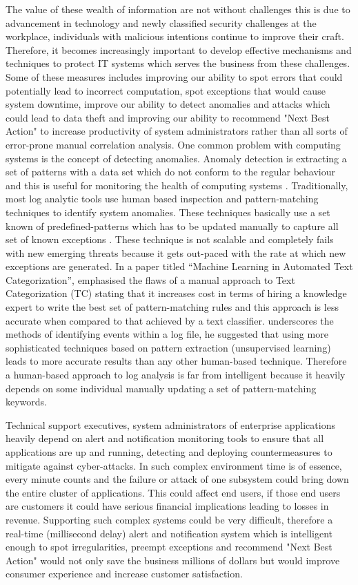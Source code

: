 \documentclass[12pt, letterpaper, titlepage]{report}
\begin{document}
The value of these wealth of information are not without challenges this is due to advancement in technology and newly classified security challenges at the workplace, individuals with malicious intentions continue to improve their craft. Therefore, it becomes increasingly important to develop effective mechanisms and techniques to protect IT systems which serves the business from these challenges. Some of these measures includes improving our ability to spot errors that could potentially lead to incorrect computation, spot exceptions that would cause system downtime, improve our ability to detect anomalies and attacks which could lead to data theft and improving our ability to recommend "Next Best Action" to increase productivity of system administrators rather than all sorts of error-prone manual correlation analysis. One common problem with computing systems is the concept of detecting anomalies. Anomaly detection is extracting a set of patterns with a data set which do not conform to the regular behaviour and this is useful for monitoring the health of computing systems \citep{chandola2009anomaly}.  Traditionally, most log analytic tools use human based inspection and pattern-matching techniques to identify system anomalies. These techniques basically use a set known of predefined-patterns which has to be updated manually to capture all set of known exceptions \citep{ma2003log}. These technique is not scalable and completely fails with new emerging threats because it gets out-paced with the rate at which new exceptions are  generated.  In a paper titled “Machine Learning in Automated Text Categorization”, \cite{sebastiani2002machine} emphasised the flaws of a manual approach to Text Categorization (TC) stating that it increases cost in terms of hiring a knowledge expert to write the best set of pattern-matching rules and this approach is less accurate when compared to that achieved by a text classifier. \cite{zwietasch2014detecting} underscores the methods of identifying events within a log file, he suggested that using more sophisticated techniques based on pattern extraction (unsupervised learning) leads to more accurate results than any other human-based technique. Therefore a human-based approach to log analysis is far from intelligent because it heavily depends on some individual manually updating a set of pattern-matching keywords.


Technical support executives, system administrators of enterprise applications heavily depend on alert and notification monitoring tools to ensure that all applications are up and running, detecting and deploying countermeasures to mitigate against cyber-attacks. In such complex environment time is of essence, every minute counts and the failure or attack of one subsystem could bring down the entire cluster of applications. This could affect end users, if those end users are customers it could have serious financial implications leading to losses in revenue. Supporting such complex systems could be very difficult, therefore a real-time (millisecond delay) alert and notification system which is intelligent enough to spot irregularities, preempt exceptions and recommend "Next Best Action" would not only save the business millions of dollars but would improve consumer experience and increase customer satisfaction.
\end{document}

